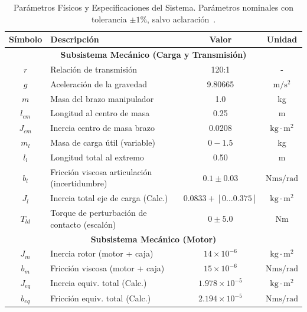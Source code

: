 \documentclass[12pt, a4paper,journal, onecolumn, compsoc]{IEEEtran}
\begin{document}
\begin{table}[htbp]
    \caption{Parámetros Físicos y Especificaciones del Sistema. Parámetros nominales con tolerancia $\pm 1\%$, salvo aclaración~\cite{guia_trabajo}.}
    \centering
    \renewcommand{\arraystretch}{1.2} %
    \begin{tabular}{|c|l|c|c|}
        \hline
        \textbf{Símbolo} & \textbf{Descripción} & \textbf{Valor} & \textbf{Unidad} \\
        \hline
        \multicolumn{4}{|c|}{\textbf{Subsistema Mecánico (Carga y Transmisión)}} \\
        \hline
        $r$ & Relación de transmisión & 120:1 & - \\
        $g$ & Aceleración de la gravedad & 9.80665 & $\text{m}/\text{s}^2$ \\
        $m$ & Masa del brazo manipulador & 1.0 & kg \\
        $l_{cm}$ & Longitud al centro de masa & 0.25 & m \\
        $J_{cm}$ & Inercia centro de masa brazo & 0.0208 & $\text{kg}\cdot\text{m}^2$ \\
        $m_l$ & Masa de carga útil (variable) & $0 - 1.5$ & kg \\
        $l_{l}$ & Longitud total al extremo & 0.50 & m \\
        $b_{l}$ & Fricción viscosa articulación (incertidumbre) & $0.1 \pm 0.03$ & $\text{Nms}/\text{rad}$ \\
        $J_l$ & Inercia total eje de carga (Calc.) & $0.0833 + [0\ldots0.375]$ & $\text{kg}\cdot\text{m}^2$ \\
        $T_{ld}$ & Torque de perturbación de contacto (escalón) & $0 \pm 5.0$ & Nm \\
        \hline
        \multicolumn{4}{|c|}{\textbf{Subsistema Mecánico (Motor)}} \\
        \hline
        $J_m$ & Inercia rotor (motor + caja) & $14 \times 10^{-6}$ & $\text{kg}\cdot\text{m}^2$ \\
        $b_m$ & Fricción viscosa (motor + caja) & $15 \times 10^{-6}$ & $\text{Nms}/\text{rad}$ \\
        $J_{eq}$ & Inercia equiv. total (Calc.) & $1.978 \times 10^{-5}$ & $\text{kg}\cdot\text{m}^2$ \\
        $b_{eq}$ & Fricción equiv. total (Calc.) & $2.194 \times 10^{-5}$ & $\text{Nms}/\text{rad}$ \\

\end{tabular}
\end{table}
\end{document}
